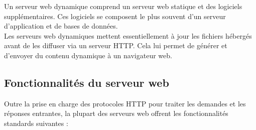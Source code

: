 Un serveur web dynamique comprend un serveur web statique et des logiciels supplémentaires. Ces logiciels se composent le plus souvent d’un serveur d’application et de bases de données.\\

Les serveurs web dynamiques mettent essentiellement à jour les fichiers hébergés avant de les diffuser via un serveur HTTP. Cela lui permet de générer et d’envoyer du contenu dynamique à un navigateur web.\\

\subsection{Fonctionnalités du serveur web}
Outre la prise en charge des protocoles HTTP pour traiter les demandes et les réponses entrantes, la plupart des serveurs web offrent les fonctionnalités standards suivantes :

